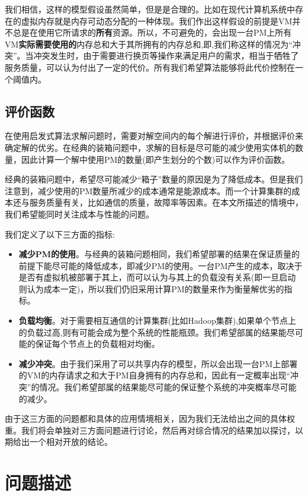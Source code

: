 我们相信，这样的模型假设虽然简单，但是是合理的。比如在现代计算机系统中存在的虚拟内存就是内存可动态分配的一种体现。我们作出这样假设的前提是VM并不总是在使用它所请求的\textbf{所有}资源。所以，不可避免的，会出现一台PM上所有VM\textbf{实际需要使用的}内存总和大于其所拥有的内存总和,即,我们称这样的情况为``冲突''。当冲突发生时，由于需要进行换页等操作来满足用户的需求，相当于牺牲了服务质量，可以认为付出了一定的代价。所有我们希望算法能够将此代价控制在一个阈值内。



\subsection*{评价函数}
\label{sec:value-function}

在使用启发式算法求解问题时，需要对解空间内的每个解进行评价，并根据评价来确定解的优劣。在经典的装箱问题中，求解的目标是尽可能的减少使用实体机的数量，因此计算一个解中使用PM的数量(即产生划分的个数)可以作为评价函数。

经典的装箱问题中，希望尽可能减少``箱子''数量的原因是为了降低成本。但是我们注意到，减少使用的PM数量所减少的成本通常是能源成本。而一个计算集群的成本还与服务质量有关，比如通信的质量，故障率等因素。在本文所描述的情境中，我们希望能同时关注成本与性能的问题。

我们定义了以下三方面的指标:

\begin{itemize}
\item \textbf{减少PM的使用}。与经典的装箱问题相同，我们希望部署的结果在保证质量的前提下能尽可能的降低成本，即减少PM的使用。一台PM产生的成本，取决于是否有虚拟机被部署于其上，而可以认为与其上的负载没有关系(即一旦启动则认为成本一定)，所以我们仍旧采用计算PM的数量来作为衡量解优劣的指标。
\item \textbf{负载均衡}。对于需要相互通信的计算集群(比如Hadoop集群),如果单个节点上的负载过高,则有可能会成为整个系统的性能瓶颈。我们希望部属的结果能尽可能的保证每个节点上的负载相对均衡。
\item \textbf{减少冲突}。由于我们采用了可以共享内存的模型，所以会出现一台PM上部署的VM的内存请求之和大于PM自身拥有的内存总和，因此有一定概率出现``冲突''的情况。我们希望部属的结果能尽可能的保证整个系统的冲突概率尽可能的减少。
\end{itemize}

由于这三方面的问题都和具体的应用情境相关，因为我们无法给出之间的具体权重。我们将会单独对三方面问题进行讨论，然后再对综合情况的结果加以探讨，以期给出一个相对开放的结论。

\section{问题描述}
\label{sec:formulation}

